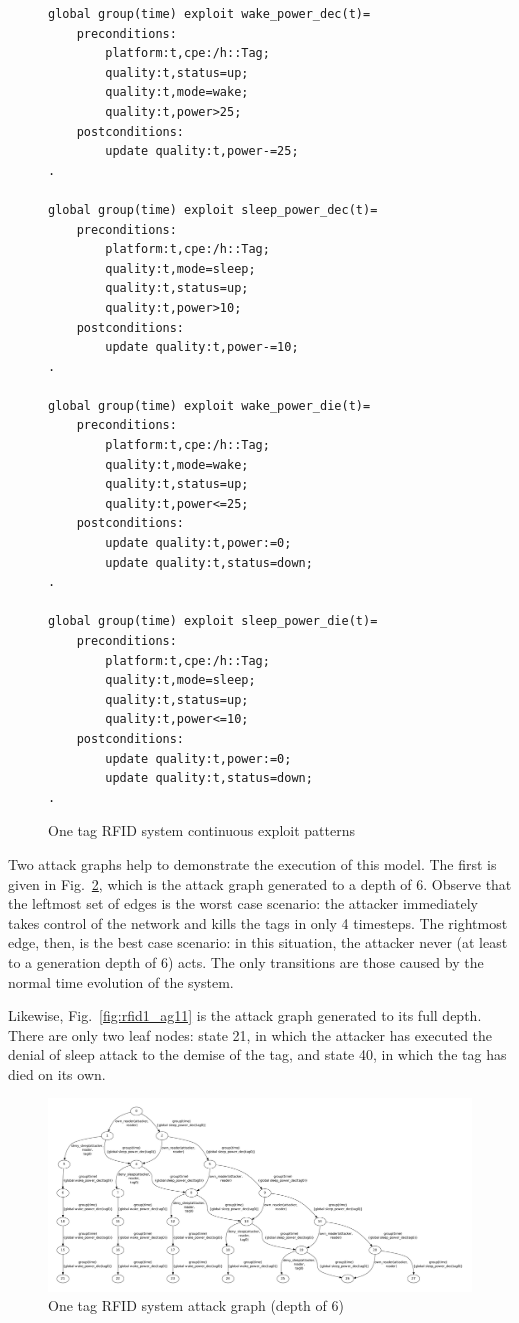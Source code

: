 \begin{figure}
\begin{lstlisting}
global group(time) exploit wake_power_dec(t)=
    preconditions:
        platform:t,cpe:/h::Tag;
        quality:t,status=up;
        quality:t,mode=wake;
        quality:t,power>25;
    postconditions:
        update quality:t,power-=25;
.

global group(time) exploit sleep_power_dec(t)=
    preconditions:
        platform:t,cpe:/h::Tag;
        quality:t,mode=sleep;
        quality:t,status=up;
        quality:t,power>10;
    postconditions:
        update quality:t,power-=10;
.

global group(time) exploit wake_power_die(t)=
    preconditions:
        platform:t,cpe:/h::Tag;
        quality:t,mode=wake;
        quality:t,status=up;
        quality:t,power<=25;
    postconditions:
        update quality:t,power:=0;
        update quality:t,status=down;
.

global group(time) exploit sleep_power_die(t)=
    preconditions:
        platform:t,cpe:/h::Tag;
        quality:t,mode=sleep;
        quality:t,status=up;
        quality:t,power<=10;
    postconditions:
        update quality:t,power:=0;
        update quality:t,status=down;
.
\end{lstlisting}
\caption{One tag RFID system continuous exploit patterns}
\label{fig:rfid1_xp2}
\end{figure}

Two attack graphs help to demonstrate the execution of this model. The first is
given in Fig.~\ref{fig:rfid1_ag6}, which is the attack graph generated to a
depth of 6. Observe that the leftmost set of edges is the worst case
scenario: the attacker immediately takes control of the network and kills
the tags in only 4 timesteps. The rightmost edge, then, is the best case
scenario: in this situation, the attacker never (at least to a generation
depth of 6) acts. The only transitions are those caused by the normal
time evolution of the system.

Likewise, Fig.~\ref{fig:rfid1_ag11} is the attack graph generated to its
full depth. There are only two leaf nodes: state 21, in which the attacker
has executed the denial of sleep attack to the demise of the tag, and state
40, in which the tag has died on its own.

\begin{figure}
\includegraphics[width=6in]{ag_dash7/sleep_ag_6}
\caption{One tag RFID system attack graph (depth of 6)}
\label{fig:rfid1_ag6}
\end{figure}

